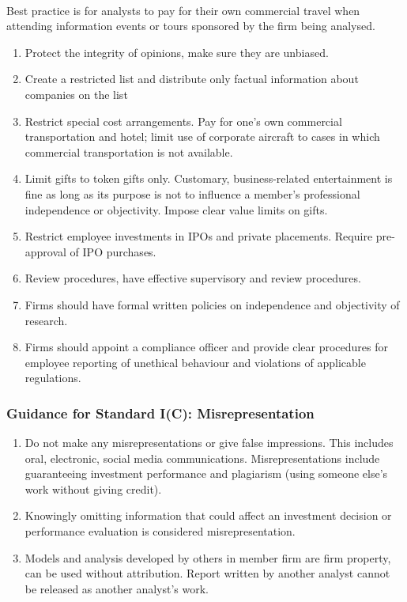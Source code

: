 \begin{remark} \\
Best practice is for analysts to pay for their own commercial travel when attending information events or tours sponsored by the firm being analysed.
\end{remark}

\begin{remark} 
\begin{enumerate}[label=\roman*.]
\setlength{\itemsep}{0pt}
\item Protect the integrity of opinions, make sure they are unbiased.
\item Create a restricted list and distribute only factual information about companies on the list
\item Restrict special cost arrangements. Pay for one's own commercial transportation and hotel; limit use of corporate aircraft to cases in which commercial transportation is not available.
\item Limit gifts to token gifts only. Customary, business-related entertainment is fine as long as its purpose is not to influence a member's professional independence or objectivity. Impose clear value limits on gifts.
\item Restrict employee investments in IPOs and private placements. Require pre-approval of IPO purchases.
\item Review procedures, have effective supervisory and review procedures.
\item Firms should have formal written policies on independence and objectivity of research.
\item Firms should appoint a compliance officer and provide clear procedures for employee reporting of unethical behaviour and violations of applicable regulations.
\end{enumerate}
\end{remark}

\subsubsection{Guidance for Standard I(C): Misrepresentation}

\begin{remark} 
\begin{enumerate}[label=\roman*.]
\setlength{\itemsep}{0pt}
\item Do not make any misrepresentations or give false impressions. This includes oral, electronic, social media communications. Misrepresentations include guaranteeing investment performance and plagiarism (using someone else's work without giving credit).
\item Knowingly omitting information that could affect an investment decision or performance evaluation is considered misrepresentation.
\item Models and analysis developed by others in member firm are firm property, can be used without attribution. Report written by another analyst cannot be released as another analyst's work.
\end{enumerate}
\end{remark}

